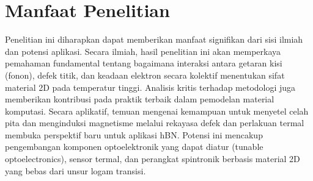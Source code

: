 \section{Manfaat Penelitian}
Penelitian ini diharapkan dapat memberikan manfaat signifikan dari sisi ilmiah dan potensi aplikasi.
Secara ilmiah, hasil penelitian ini akan memperkaya pemahaman fundamental tentang bagaimana interaksi antara getaran kisi (fonon), defek titik, dan keadaan elektron secara kolektif menentukan sifat material 2D pada temperatur tinggi. Analisis kritis terhadap metodologi juga memberikan kontribusi pada praktik terbaik dalam pemodelan material komputasi.
Secara aplikatif, temuan mengenai kemampuan untuk menyetel celah pita dan menginduksi magnetisme melalui rekayasa defek dan perlakuan termal membuka perspektif baru untuk aplikasi hBN. Potensi ini mencakup pengembangan komponen optoelektronik yang dapat diatur (tunable optoelectronics), sensor termal, dan perangkat spintronik berbasis material 2D yang bebas dari unsur logam transisi.